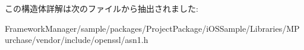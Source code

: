 この構造体詳解は次のファイルから抽出されました\+:\begin{DoxyCompactItemize}
\item 
Framework\+Manager/sample/packages/\+Project\+Package/i\+O\+S\+Sample/\+Libraries/\+M\+Purchase/vendor/include/openssl/asn1.\+h\end{DoxyCompactItemize}

